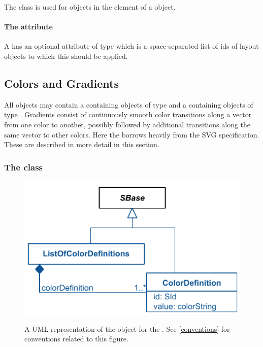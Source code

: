 The \LocalStyle class is used for objects in the \ListOfLocalStyles element of a 
\LocalRenderInformation object.

\paragraph{The \fixttspace{} attribute}

A \LocalStyle has an optional attribute  of type
 which is a space-separated list of ids of layout objects to 
which this \Style should be applied.


\subsection{Colors and Gradients}

All \RenderInformation objects may contain a \ListOfColorDefinitions containing 
objects of type \ColorDefinition and a \ListOfGradientDefinitions containing 
objects of type \GradientBase. Gradients consist of continuously smooth color 
transitions along a vector from one color to another, possibly followed by 
additional transitions along the same vector to other colors. Here the \RenderPackage 
borrows heavily from the SVG specification. These are described in more detail in this section. 
 
\subsubsection{The  class}
\label{colordefinition-class}

\begin{figure}[!ht]
  \centering
  \includegraphics{images/render-color-definition-uml}\\
  \caption{A UML representation of the \ColorDefinition object for the \RenderPackage.  See \ref{conventions} for conventions related to this figure. }
  \label{fig:color_render_uml}
\end{figure}


